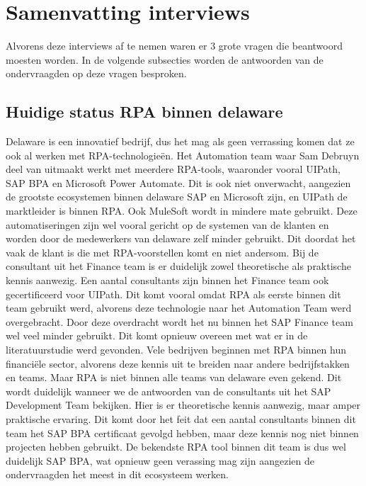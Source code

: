 \section{Samenvatting interviews}
\label{sec:samenvatting-interviews}

Alvorens deze interviews af te nemen waren er 3 grote vragen die beantwoord moesten worden. In de volgende subsecties worden de antwoorden van de ondervraagden op deze vragen besproken.

\subsection{Huidige status RPA binnen delaware}
\label{subsec:huidige-status-rpa-binnen-delaware}

Delaware is een innovatief bedrijf, dus het mag als geen verrassing komen dat ze ook al werken met RPA-technologieën.
Het Automation team waar Sam Debruyn deel van uitmaakt werkt met meerdere RPA-tools, waaronder vooral UIPath, SAP BPA en Microsoft Power Automate. Dit is ook niet onverwacht, aangezien de grootste ecosystemen binnen delaware SAP en Microsoft zijn, en UIPath de marktleider is binnen RPA. Ook MuleSoft wordt in mindere mate gebruikt.
Deze automatiseringen zijn wel vooral gericht op de systemen van de klanten en worden door de medewerkers van delaware zelf minder gebruikt. Dit doordat het vaak de klant is die met RPA-voorstellen komt en niet andersom.
Bij de consultant uit het Finance team is er duidelijk zowel theoretische als praktische kennis aanwezig. Een aantal consultants zijn binnen het Finance team ook gecertificeerd voor UIPath. Dit komt vooral omdat RPA als eerste binnen dit team gebruikt werd, alvorens deze technologie naar het Automation Team werd overgebracht. Door deze overdracht wordt het nu binnen het SAP Finance team wel veel minder gebruikt. Dit komt opnieuw overeen met wat er in de literatuurstudie werd gevonden. Vele bedrijven beginnen met RPA binnen hun financiële sector, alvorens deze kennis uit te breiden naar andere bedrijfstakken en teams.
Maar RPA is niet binnen alle teams van delaware even gekend. Dit wordt duidelijk wanneer we de antwoorden van de consultants uit het SAP Development Team bekijken. Hier is er theoretische kennis aanwezig, maar amper praktische ervaring. Dit komt door het feit dat een aantal consultants binnen dit team het SAP BPA certificaat gevolgd hebben, maar deze kennis nog niet binnen projecten hebben gebruikt. De bekendste RPA tool binnen dit team is dus wel duidelijk SAP BPA, wat opnieuw geen verassing mag zijn aangezien de ondervraagden het meest in dit ecosysteem werken.

